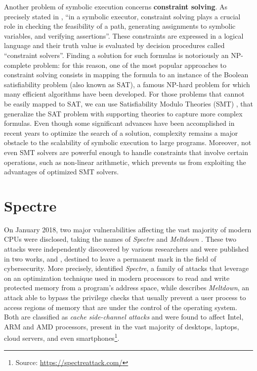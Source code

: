\documentclass[12pt,a4paper]{book}
\theoremstyle{definition}
\begin{document}
	Another problem of symbolic execution concerns \textbf{constraint solving}. As precisely stated in \cite{Baldoni2018}, ``in a symbolic executor, constraint solving plays a crucial role in checking the feasibility of a path, generating assignments to symbolic variables, and verifying assertions''. These constraints are expressed in a logical language and their truth value is evaluated by decision procedures called ``constraint solvers''. 
	Finding a solution for such formulas is notoriously an NP-complete problem: for this reason, one of the most popular approaches to constraint solving consists in mapping the formula to an instance of the Boolean satisfiability problem (also known as SAT), a famous NP-hard problem for which many efficient algorithms have been developed. For those problems that cannot be easily mapped to SAT, we can use Satisfiability Modulo Theories (SMT) \cite{Tinelli2006}, that generalize the SAT problem with supporting theories to capture more complex formulas. Even though some significant advances have been accomplished in recent years to optimize the search of a solution, complexity remains a major obstacle to the scalability of symbolic execution to large programs. Moreover, not even SMT solvers are powerful enough to handle constraints that involve certain operations, such as non-linear arithmetic, which prevents us from exploiting the advantages of optimized SMT solvers.
	
	\chapter{Spectre}\label{chapter:spectre}
	On January 2018, two major vulnerabilities affecting the vast majority of modern CPUs were disclosed, taking the names of \textit{Spectre} \cite{Kocher2019} and \textit{Meltdown} \cite{Lipp2018}. These two attacks were independently discovered by various researchers and were published in 
	two works, \cite{Kocher2019} and \cite{Lipp2018}, destined to leave a permanent mark in the field of cybersecurity. More precisely, \cite{Kocher2019} identified \textit{Spectre}, a family of attacks that leverage on an optimization technique used in modern processors to read and write protected memory from a program's address space, while \cite{Lipp2018} describes \textit{Meltdown}, an attack able to bypass the privilege checks that usually prevent a user process to access regions of memory that are under the control of the operating system. Both are classified as \textit{cache side-channel attacks} and were found to affect Intel, ARM and AMD processors, present in the vast majority of desktops, laptops, cloud servers, and even smartphones\footnote{Source: \url{https://spectreattack.com/}}.
	
\end{document}
